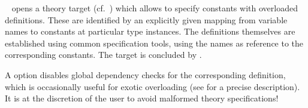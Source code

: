 \begin{isabellebody}
\begin{isamarkuptext}
\begin{description}
  \item \hyperlink{command.overloading}{\mbox{}}~
  opens a theory target (cf.\ ) which allows to
  specify constants with overloaded definitions.  These are identified
  by an explicitly given mapping from variable names  to
  constants  at particular type instances.  The
  definitions themselves are established using common specification
  tools, using the names  as reference to the
  corresponding constants.  The target is concluded by \hyperlink{command.local.end}{\mbox{}}.

  A  option disables global dependency checks for
  the corresponding definition, which is occasionally useful for
  exotic overloading (see  for a precise description).
  It is at the discretion of the user to avoid
  malformed theory specifications!


\end{description}
\end{isamarkuptext}
\end{isabellebody}
